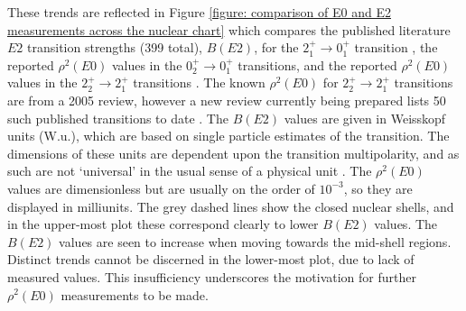 These trends are reflected in Figure \ref{figure: comparison of E0 and E2 measurements across the nuclear chart} which compares the published literature $E2$ transition strengths (399 total), $B(E2)$, for the $2^+_1 \rightarrow 0^+_1$ transition \cite{Pritychenko2016}, the reported $\rho^2(E0)$ values in the $0^+_2 \rightarrow 0^+_1$ transitions, and the reported $\rho^2(E0)$ values in the $2^+_2 \rightarrow 2^+_1$ transitions \cite{Kibedi2005}.  The known $\rho^2(E0)$ for $2^+_2 \rightarrow 2^+_1$ transitions are from a 2005 review, however a new review currently being prepared lists 50 such published transitions to date \cite{Kibedi2018}. The $B(E2)$ values are given in Weisskopf units (W.u.), which are based on single particle estimates of the transition. The dimensions of these units are dependent upon the transition multipolarity, and as such are not `universal' in the usual sense of a physical unit \cite{KraneText}. The $\rho^2(E0)$ values are dimensionless but are usually on the order of $10^{-3}$, so they are displayed in milliunits. The grey dashed lines show the closed nuclear shells, and in the upper-most plot these correspond clearly to lower $B(E2)$ values. The $B(E2)$ values are seen to increase when moving towards the mid-shell regions. Distinct trends cannot be discerned in the lower-most plot, due to lack of measured values. This insufficiency underscores the motivation for further $\rho^2(E0)$ measurements to be made.

